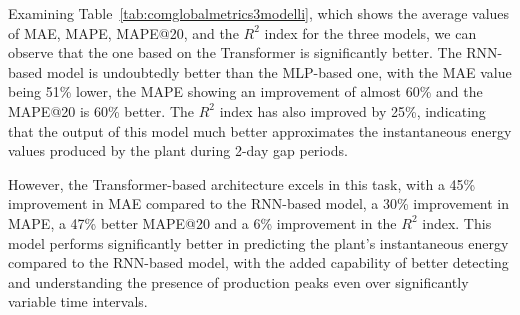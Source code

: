 \begin{figure}[]
	\label{fig:cmperrs}
\end{figure}

Examining Table~\ref{tab:comglobalmetrics3modelli}, which shows the average values of MAE, MAPE, MAPE@20, and the $R^2$ index for the three models, we can observe that the one based on the Transformer is significantly better. The RNN-based model is undoubtedly better than the MLP-based one, with the MAE value being 51\% lower, the MAPE showing an improvement of almost 60\% and the MAPE@20 is 60\% better. The $R^2$ index has also improved by 25\%, indicating that the output of this model much better approximates the instantaneous energy values produced by the plant during 2-day gap periods.

However, the Transformer-based architecture excels in this task, with a 45\% improvement in MAE compared to the RNN-based model, a 30\% improvement in MAPE, a 47\% better MAPE@20 and a 6\% improvement in the $R^2$ index. This model performs significantly better in predicting the plant's instantaneous energy compared to the RNN-based model, with the added capability of better detecting and understanding the presence of production peaks even over significantly variable time intervals.

%

